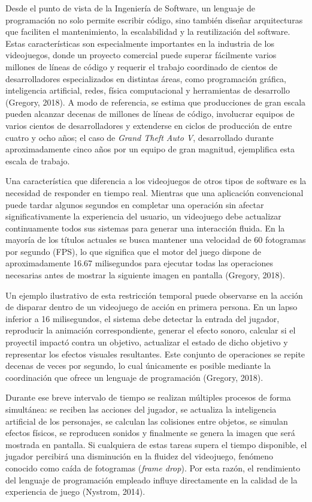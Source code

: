 \documentclass[12pt]{report}
\begin{document}
Desde el punto de vista de la Ingeniería de Software, un lenguaje de programación no solo permite escribir código, sino también diseñar arquitecturas que faciliten el mantenimiento, la escalabilidad y la reutilización del software. Estas características son especialmente importantes en la industria de los videojuegos, donde un proyecto comercial puede superar fácilmente varios millones de líneas de código y requerir el trabajo coordinado de cientos de desarrolladores especializados en distintas áreas, como programación gráfica, inteligencia artificial, redes, física computacional y herramientas de desarrollo (Gregory, 2018). A modo de referencia, se estima que producciones de gran escala pueden alcanzar decenas de millones de líneas de código, involucrar equipos de varios cientos de desarrolladores y extenderse en ciclos de producción de entre cuatro y ocho años; el caso de \textit{Grand Theft Auto V}, desarrollado durante aproximadamente cinco años por un equipo de gran magnitud, ejemplifica esta escala de trabajo.

Una característica que diferencia a los videojuegos de otros tipos de software es la necesidad de responder en tiempo real. Mientras que una aplicación convencional puede tardar algunos segundos en completar una operación sin afectar significativamente la experiencia del usuario, un videojuego debe actualizar continuamente todos sus sistemas para generar una interacción fluida. En la mayoría de los títulos actuales se busca mantener una velocidad de 60 fotogramas por segundo (FPS), lo que significa que el motor del juego dispone de aproximadamente 16.67 milisegundos para ejecutar todas las operaciones necesarias antes de mostrar la siguiente imagen en pantalla (Gregory, 2018).

Un ejemplo ilustrativo de esta restricción temporal puede observarse en la acción de disparar dentro de un videojuego de acción en primera persona. En un lapso inferior a 16 milisegundos, el sistema debe detectar la entrada del jugador, reproducir la animación correspondiente, generar el efecto sonoro, calcular si el proyectil impactó contra un objetivo, actualizar el estado de dicho objetivo y representar los efectos visuales resultantes. Este conjunto de operaciones se repite decenas de veces por segundo, lo cual únicamente es posible mediante la coordinación que ofrece un lenguaje de programación (Gregory, 2018).

Durante ese breve intervalo de tiempo se realizan múltiples procesos de forma simultánea: se reciben las acciones del jugador, se actualiza la inteligencia artificial de los personajes, se calculan las colisiones entre objetos, se simulan efectos físicos, se reproducen sonidos y finalmente se genera la imagen que será mostrada en pantalla. Si cualquiera de estas tareas supera el tiempo disponible, el jugador percibirá una disminución en la fluidez del videojuego, fenómeno conocido como caída de fotogramas (\textit{frame drop}). Por esta razón, el rendimiento del lenguaje de programación empleado influye directamente en la calidad de la experiencia de juego (Nystrom, 2014).
\end{document}
